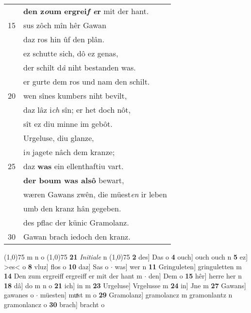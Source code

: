 \documentclass[8pt,a4paper,notitlepage]{article}
\begin{document}
\begin{table}[ht]
\begin{minipage}[t]{0.5\linewidth}
\begin{tabular}{rl}
 & \textbf{den z\textit{o}um ergrei\textit{f e}r} mit der hant.\\ 
15 & sus zôch mîn hêr Gawan\\ 
 & daz ros hin ûf den plân.\\ 
 & ez schutte sich, dô ez genas,\\ 
 & der schilt d\textit{â} niht bestanden was.\\ 
 & er gurte dem ros und nam den schilt.\\ 
20 & wen sînes kumbers niht bevilt,\\ 
 & daz lâz i\textit{ch} sîn; er het doch nôt,\\ 
 & sît ez diu minne im gebôt.\\ 
 & Urgeluse, diu glanze,\\ 
 & i\textit{n} jagete nâch dem kranze;\\ 
25 & daz \textbf{was} ein ellenthaftiu vart.\\ 
 & \textbf{der boum was alsô} bewart,\\ 
 & wæren Gawans zwên, die müest\textit{en} ir leben\\ 
 & umb den kranz hân gegeben.\\ 
 & des pflac der künic Gramolanz.\\ 
30 & Gawan brach iedoch den kranz.\\ 
\end{tabular}
\scriptsize
\line(1,0){75} \newline
m n o \newline
\line(1,0){75} \newline
\textbf{21} \textit{Initiale} n  \newline
\line(1,0){75} \newline
\textbf{2} des] Das o \textbf{4} ouch] ouch ouch n \textbf{5} ez] >es< o \textbf{8} vluz] flos o \textbf{10} daz] Sas o  $\cdot$ was] wer n \textbf{11} Gringuleten] gringuletten m \textbf{14} Den zum ergreiff ergreiff er mit der hant m  $\cdot$ den] Dem o \textbf{15} hêr] herre her n \textbf{18} dâ] do m n o \textbf{21} ich] in m \textbf{23} Urgeluse] Vrgelusse m \textbf{24} in] Jne m \textbf{27} Gawans] gawanes o  $\cdot$ müesten] muͯst m o \textbf{29} Gramolanz] gramolancz m gramonlantz n gramonlancz o \textbf{30} brach] bracht o \newline
\end{minipage}
\end{table}
\newpage
\end{document}
